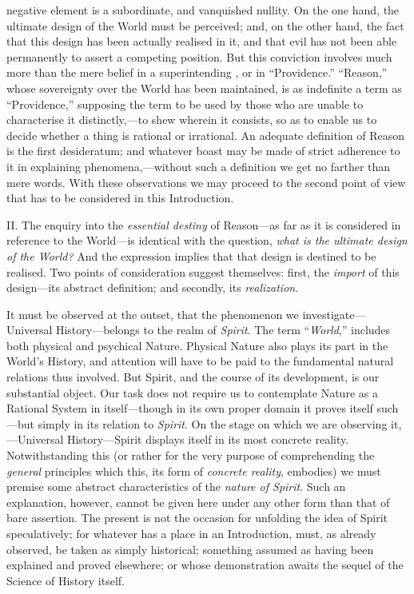 negative element is a subordinate, and vanquished nullity. On the one
hand, the ultimate design of the World must be perceived; and, on the
other hand, the fact that this design has been actually realised in
it, and that evil has not been able permanently to assert a competing
position. But this conviction involves much more than the mere belief
in a superintending , or in ``Providence.'' ``Reason,''
whose sovereignty over the World has been maintained, is as indefinite
a term as ``Providence,'' supposing the term to be used by those who
are unable to characterise it distinctly,---to shew wherein it
consists, so as to enable us to decide whether a thing is rational or
irrational. An adequate definition of Reason is the first desideratum;
and whatever  boast may be made of strict adherence to it in
explaining phenomena,---without such a definition we get no farther
than mere words. With these observations we may proceed to the second
point of view that has to be considered in this Introduction.

II. The enquiry into the \textit{essential destiny} of Reason---as far
as it is considered in reference to the World---is identical with the
question, \textit{what is the ultimate design of the World?} And the
expression implies that that design is destined to be realised. Two
points of consideration suggest themselves: first, the \textit{import}
of this design---its abstract definition; and secondly, its
\textit{realization}.

It must be observed at the outset, that the phenomenon we
in\-ves\-ti\-gate---Universal History---belongs to the realm of
\textit{Spirit}. The term ``\textit{World},'' includes both physical
and psychical Nature. Physical Nature also plays its part in the
World's History, and attention will have to be paid to the fundamental
natural relations thus involved. But Spirit, and the course of its
development, is our substantial object. Our task does not require us
to contemplate Nature as a Rational System in itself---though in its
own proper domain it proves itself such---but simply in its relation
to \textit{Spirit}. On the stage on which we are observing
it,---Universal History---Spirit displays itself in its most concrete
reality. Notwithstanding this (or rather for the very purpose of
comprehending the \textit{general} principles which this, its form of
\textit{concrete reality}, embodies) we must premise some abstract
characteristics of the \textit{nature of Spirit}. Such an explanation,
however, cannot be given here under any other form than that of bare
assertion. The present is not the occasion for unfolding the idea of
Spirit speculatively; for whatever has a place in an Introduction,
must, as already observed, be taken as simply historical; something
assumed as having been explained and proved elsewhere; or whose
demonstration awaits the sequel of the Science of History itself.

